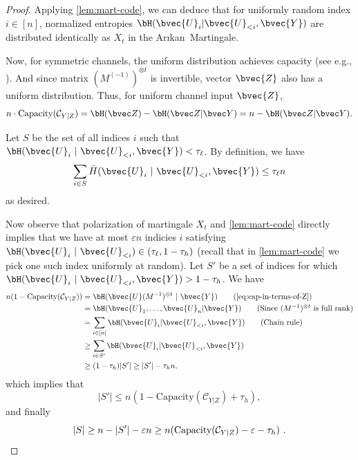 \documentclass[11pt]{article}
\newcommand{\Arikan}{Ar\i kan}
\newcommand{\cC}{\mathcal{C}}
\newcommand{\two}{}
\begin{document}
\begin{proof}

	Applying \cref{lem:mart-code}, we can deduce that for uniformly random index $i \in [n]$, normalized entropies $\bH(\bvec{U}_i | \bvec{U}_{< i}, \bvec{Y})$ are distributed identically as $X_t$ in the \Arikan~Martingale.
	
	Now, for symmetric channels, the uniform distribution achieves
	capacity (see e.g., \cite[Theorem 7.2.1]{CoverThomas}). And since matrix $(M^{(-1)})^{\otimes t}$ is invertible, vector $\bvec{Z}$ also has a uniform distribution.
	Thus, for uniform channel
	input $\bvec{Z}$,
	\begin{equation}
	\label{eq:cap-in-terms-of-Z}
	n\cdot \text{Capacity}(\cC_{Y|Z})
	= \bH(\bvec Z) - \bH(\bvec Z | \bvec Y)
	= n-\bH(\bvec Z |  \bvec Y).	    
	\end{equation}

	
	Let $S$ be the set of all indices $i$ such that $\bH(\bvec{U}_i ~|~ \bvec{U}_{<i}, \bvec{Y}) < \tau_\ell$.
	By definition, we have
	$$
	\sum_{i \in S}
	\bar H( \bvec{U}_{i} ~|~ \bvec{U}_{< i}, \bvec{Y}) \leq \tau_\ell n
	$$
	as desired.
	
	Now observe that polarization of martingale $X_t$ and \cref{lem:mart-code} directly implies that we have at most $\varepsilon n$ indicies $i$ satisfying $\bH(\bvec{U}_i ~|~ \bvec{U}_{<i}) \in (\tau_\ell, 1-\tau_h)$ (recall that in \cref{lem:mart-code} we pick one such index uniformly at random). Let $S'$ be a set of indices for which $\bH(\bvec{U}_i ~|~ \bvec{U}_{<i}, \bvec{Y}) > 1 - \tau_h$. We have
	\begin{align*}
		n (1 - \text{Capacity}(\cC_{Y|Z})) & = \bH(\bvec{U} (M^{-1})^{\otimes t} ~|~ \bvec{Y}) \tag{\cref{eq:cap-in-terms-of-Z}}\\
		& = \bH(\bvec{U}_{1}, \ldots, \bvec{U}_{n} | \bvec{Y}) \tag{Since
			$(M^{-1})^{\otimes t}$ is full rank}\\
		& = \sum_{i \in [n]} \bH(\bvec{U}_{i} | \bvec{U}_{<i}, \bvec{Y}) \tag{Chain
			rule}\\
		& \geq \sum_{i \in S'} \bH(\bvec{U}_{i} | \bvec{U}_{<i}, \bvec{Y}) \\
		& \geq (1 - \tau_h) |S'| \ge |S'| - \tau_h n , 
	\end{align*}
	which implies that
	\begin{equation*}
		|S'| \leq n(1 - \text{Capacity}(\cC_{Y|Z}) + \two \tau_h),
	\end{equation*}
	and finally 
	\begin{equation*}
		|S| \geq n - |S'| - \varepsilon n \geq
		n (\text{Capacity}(\cC_{Y|Z}) - \varepsilon - \two \tau_h) \ . \qedhere
	\end{equation*}
\end{proof}
\end{document}
